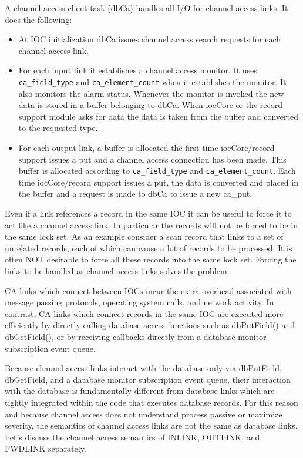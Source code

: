 A channel access client task (dbCa)  handles all I/O for channel access links. It does the following:

\begin{itemize}
\item At IOC initialization dbCa issues channel access search requests for each channel access link.

\item For each input link it establishes a channel access monitor. It uses \verb|ca_field_type| and \verb|ca_element_count| 
when it establishes the monitor. It also monitors the alarm status. Whenever the monitor is invoked the new data is 
stored in a buffer belonging to dbCa. When iocCore or the record support module asks for data the data is taken 
from the buffer and converted to the requested type.

\item For each output link, a buffer is allocated the first time iocCore/record support issues a put and a channel access 
connection has been made. This buffer is allocated according to  \verb|ca_field_type| and \verb|ca_element_count|. 
Each time iocCore/record support issues a put, the data is converted and placed in the buffer and a request is made 
to dbCa to issue a new ca\_put.

\end{itemize}

Even if a link references a record in the same IOC it can be useful to force it to act like a channel access link. In particular 
the records will not be forced to be in the same lock set. As an example consider a scan record that links to a set of 
unrelated records, each of which can cause a lot of records to be processed. It is often NOT desirable to force all these 
records into the same lock set. Forcing the links to be handled as channel access links solves the problem.

CA links which connect between IOCs incur the extra overhead associated with message passing protocols, operating 
system calls, and network activity. In contrast, CA links which connect records in the same IOC are executed more 
efficiently by directly calling database access functions such as dbPutField() and dbGetField(), or by receiving callbacks 
directly from a database monitor subscription event queue.

Because channel access links interact with the database only via dbPutField, dbGetField, and a database monitor 
subscription event queue, their interaction with the database is fundamentally different from database links which are 
tightly integrated within the code that executes database records. For this reason and because channel access does not 
understand process passive or maximize severity, the semantics of channel access links are not the same as database links. 
Let's discuss the channel access semantics of INLINK, OUTLINK, and FWDLINK separately.

